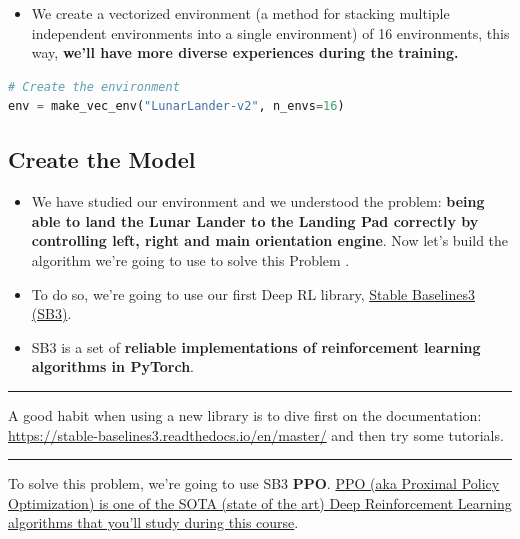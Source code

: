 \documentclass[11pt,a4paper]{article}
\begin{document}
\begin{itemize}
\tightlist
\item
  We create a vectorized environment (a method for stacking multiple independent environments into a single environment) of 16 environments, this way, \textbf{we'll have more diverse experiences during the training.}
\end{itemize}

\begin{lstlisting}[language=Python]
# Create the environment
env = make_vec_env("LunarLander-v2", n_envs=16)
\end{lstlisting}

\subsection{Create the Model}\label{create-the-model}

\begin{itemize}
\item
  We have studied our environment and we understood the problem: \textbf{being able to land the Lunar Lander to the Landing Pad correctly by controlling left, right and main orientation engine}. Now let's build the algorithm we're going to use to solve this Problem .
\item
  To do so, we're going to use our first Deep RL library, \href{https://stable-baselines3.readthedocs.io/en/master/}{Stable Baselines3 (SB3)}.
\item
  SB3 is a set of \textbf{reliable implementations of reinforcement learning algorithms in PyTorch}.
\end{itemize}

\begin{center}\rule{0.5\linewidth}{0.5pt}\end{center}

A good habit when using a new library is to dive first on the documentation: \url{https://stable-baselines3.readthedocs.io/en/master/} and then try some tutorials.

\begin{center}\rule{0.5\linewidth}{0.5pt}\end{center}


To solve this problem, we're going to use SB3 \textbf{PPO}. \href{https://stable-baselines3.readthedocs.io/en/master/modules/ppo.html\#example\%5D}{PPO (aka Proximal Policy Optimization) is one of the SOTA (state of the art) Deep Reinforcement Learning algorithms that you'll study during this course}.
\end{document}
